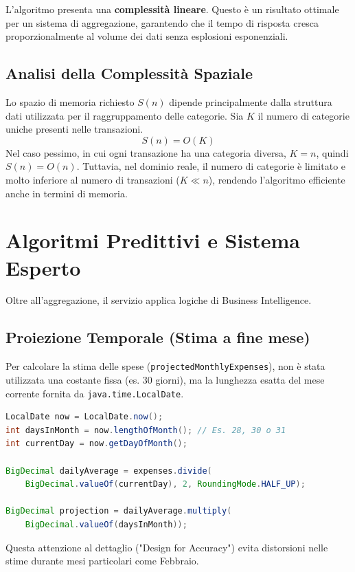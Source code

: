 L'algoritmo presenta una \textbf{complessità lineare}. Questo è un risultato ottimale per un sistema di aggregazione, garantendo che il tempo di risposta cresca proporzionalmente al volume dei dati senza esplosioni esponenziali.

\subsection{Analisi della Complessità Spaziale}
Lo spazio di memoria richiesto $S(n)$ dipende principalmente dalla struttura dati utilizzata per il raggruppamento delle categorie.
Sia $K$ il numero di categorie uniche presenti nelle transazioni.
\[ S(n) = O(K) \]
Nel caso pessimo, in cui ogni transazione ha una categoria diversa, $K = n$, quindi $S(n) = O(n)$.
Tuttavia, nel dominio reale, il numero di categorie è limitato e molto inferiore al numero di transazioni ($K \ll n$), rendendo l'algoritmo efficiente anche in termini di memoria.

\newpage
\section{Algoritmi Predittivi e Sistema Esperto}

Oltre all'aggregazione, il servizio applica logiche di Business Intelligence.

\subsection{Proiezione Temporale (Stima a fine mese)}
Per calcolare la stima delle spese (\texttt{projectedMonthlyExpenses}), non è stata utilizzata una costante fissa (es. 30 giorni), ma la lunghezza esatta del mese corrente fornita da \texttt{java.time.LocalDate}.

\bigskip

\begin{lstlisting}[language=Java, label={lst:projection}]
LocalDate now = LocalDate.now();
int daysInMonth = now.lengthOfMonth(); // Es. 28, 30 o 31
int currentDay = now.getDayOfMonth();

BigDecimal dailyAverage = expenses.divide(
    BigDecimal.valueOf(currentDay), 2, RoundingMode.HALF_UP);
    
BigDecimal projection = dailyAverage.multiply(
    BigDecimal.valueOf(daysInMonth));
\end{lstlisting}

Questa attenzione al dettaglio ("Design for Accuracy") evita distorsioni nelle stime durante mesi particolari come Febbraio.

